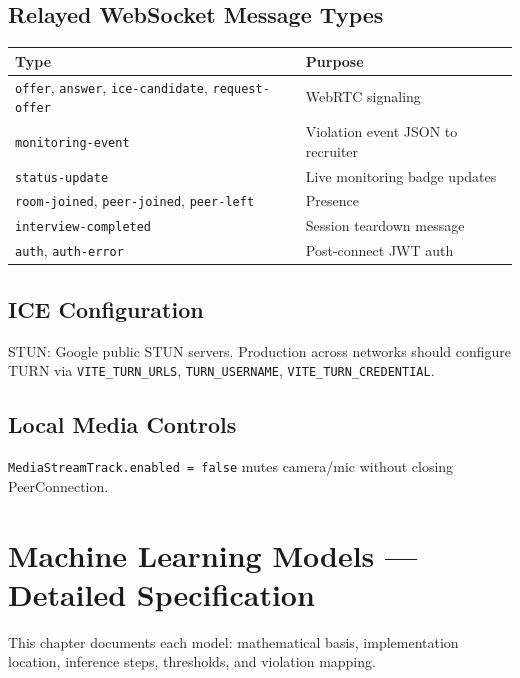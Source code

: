 \documentclass[11pt,a4paper]{report}
\begin{document}
\section{Relayed WebSocket Message Types}

\begin{table}[H]
\centering
\small
\begin{tabularx}{\textwidth}{@{}lX@{}}
\toprule
\textbf{Type} & \textbf{Purpose} \\
\midrule
\texttt{offer}, \texttt{answer}, \texttt{ice-candidate}, \texttt{request-offer} & WebRTC signaling \\
\texttt{monitoring-event} & Violation event JSON to recruiter \\
\texttt{status-update} & Live monitoring badge updates \\
\texttt{room-joined}, \texttt{peer-joined}, \texttt{peer-left} & Presence \\
\texttt{interview-completed} & Session teardown message \\
\texttt{auth}, \texttt{auth-error} & Post-connect JWT auth \\
\bottomrule
\end{tabularx}
\end{table}

\section{ICE Configuration}
STUN: Google public STUN servers. Production across networks should configure TURN via \texttt{VITE\_TURN\_URLS}, \texttt{TURN\_USERNAME}, \texttt{VITE\_TURN\_CREDENTIAL}.

\section{Local Media Controls}
\texttt{MediaStreamTrack.enabled = false} mutes camera/mic without closing PeerConnection.

\chapter{Machine Learning Models --- Detailed Specification}

This chapter documents each model: mathematical basis, implementation location, inference steps, thresholds, and violation mapping.
\end{document}
